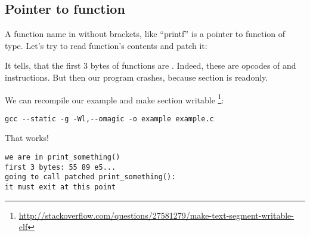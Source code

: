 \subsection{Pointer to function}

A function name in \CCpp without brackets, like ``printf'' is a pointer to function of  type.
Let's try to read function's contents and patch it:



It tells, that the first 3 bytes of functions are .
Indeed, these are opcodes of  and  instructions.
But then our program crashes, because  section is readonly.

We can recompile our example and make  section writable
\footnote{\url{http://stackoverflow.com/questions/27581279/make-text-segment-writable-elf}}:

\begin{lstlisting}
gcc --static -g -Wl,--omagic -o example example.c
\end{lstlisting}

That works!

\begin{lstlisting}
we are in print_something()
first 3 bytes: 55 89 e5...
going to call patched print_something():
it must exit at this point
\end{lstlisting}

